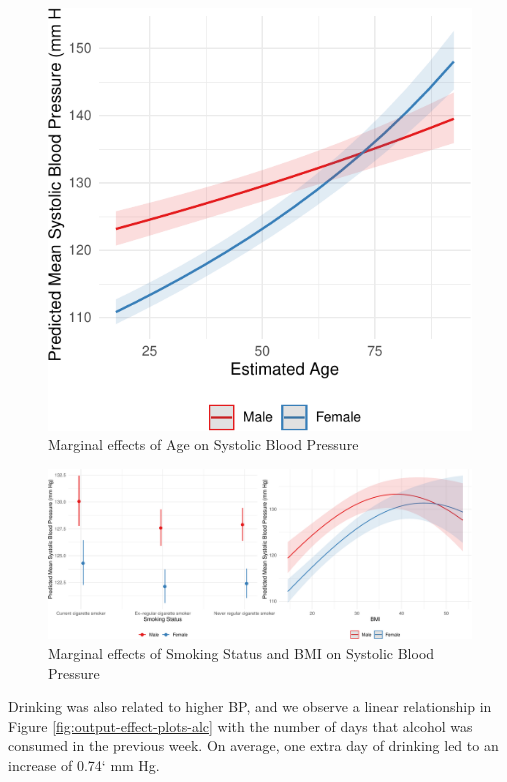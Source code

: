 \documentclass[
  11pt,
  twocolumn]{article}
\begin{document}
\begin{figure}[H]
\includegraphics{Coursework_files/figure-latex/output-effect-plots-age-1} \caption{Marginal effects of Age on Systolic Blood Pressure}\label{fig:output-effect-plots-age}
\end{figure}

\begin{figure}[H]
\includegraphics{Coursework_files/figure-latex/output-effect-plots-1} \caption{Marginal effects of Smoking Status and BMI on Systolic Blood Pressure}\label{fig:output-effect-plots}
\end{figure}

Drinking was also related to higher BP, and we observe a linear
relationship in Figure \ref{fig:output-effect-plots-alc} with the number
of days that alcohol was consumed in the previous week. On average, one
extra day of drinking led to an increase of 0.74` mm Hg.
\end{document}
